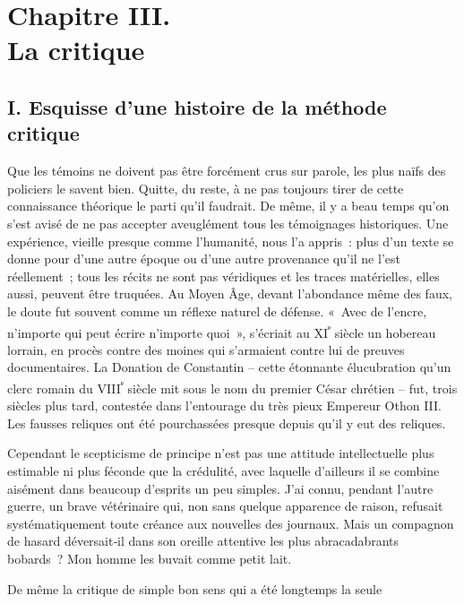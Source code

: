 \documentclass[french,twoside]{book} %
\begin{document}
\section[{Chapitre III. La critique}]{Chapitre III. \\
La critique}\renewcommand{\leftmark}{Chapitre III. \\
La critique}

\subsection[{I. Esquisse d’une histoire de la méthode critique}]{I. Esquisse d’une histoire de la méthode critique}
\noindent  {}
\label{p35} Que les témoins ne doivent pas être forcément crus sur parole, les plus naïfs des policiers le savent bien. Quitte, du reste, à ne pas toujours tirer de cette connaissance théorique le parti qu’il faudrait. De même, il y a beau temps qu’on s’est avisé de ne pas accepter aveuglément tous les témoignages historiques. Une expérience, vieille presque comme l’huma­nité, nous l’a appris : plus d’un texte se donne pour d’une autre époque ou d’une autre provenance qu’il ne l’est réellement ; tous les récits ne sont pas véridiques et les traces matérielles, elles aussi, peuvent être truquées. Au Moyen Âge, devant l’abondance même des faux, le doute fut souvent comme un réflexe naturel de défense. « Avec de l’encre, n’im­porte qui peut écrire n’importe quoi », s’écriait au XI\textsuperscript{ᵉ} siècle un hobereau lorrain, en procès contre des moines qui s’armaient contre lui de preuves documentaires. La Donation de Constantin – cette étonnante élucubra­tion qu’un clerc romain du VIII\textsuperscript{ᵉ} siècle mit sous le nom du premier César chrétien – fut, trois siècles plus tard, contestée dans l’entourage du très pieux Empereur Othon III. Les fausses reliques ont été pourchassées presque depuis qu’il y eut des reliques.\par
Cependant le scepticisme de principe n’est pas une attitude intellec­tuelle plus estimable ni plus féconde que la crédulité, avec laquelle d’ail­leurs il se combine aisément dans beaucoup d’esprits un peu simples. J’ai connu, pendant l’autre guerre, un brave vétérinaire qui, non sans quelque apparence de raison, refusait systématiquement toute créance aux nouvelles des journaux. Mais un compagnon de hasard déversait‑il dans son oreille attentive les plus abracadabrants bobards ? Mon homme les buvait comme petit lait.\par
De même la critique de simple bon sens qui a été longtemps la seule  
\end{document}
